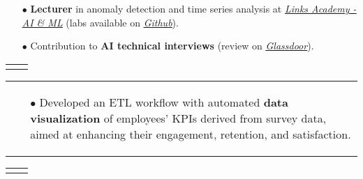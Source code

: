 \documentclass[11pt,a4paper,sans,english]{moderncv}
\makeatletter
\renewcommand*{\cventry}[6][.25em]{%
	\vspace{1.5mm}%
	\begin{tabular*}{\textwidth}{@{\extracolsep{\fill}}ll}%
		\ifthenelse{\equal{#3}{}}{}{\textbf{#3}} &
		\ifthenelse{\equal{#2}{}}{}{#4 #6 #2}\\%
	\end{tabular*}%
	\par\addvspace{#1}}
\newcommand*{\mycvitem}[2][.25em]{%
	\vspace{-.25em}
	\begin{tabular}{@{}p{\textwidth}@{}}%
		\small#2%
	\end{tabular}%
	\par\addvspace{-0.7em}  %
}
\newcommand*{\cvtag}[1]{%
	\textcolor{lightgray!50!black}{\fbox{\mathstrut\scriptsize\textsf{\textbf{#1}}}}%
}
\makeatother
\begin{document}
{\begin{itemize}
			\item[$\bullet$] \textbf{Lecturer} in anomaly detection  and time series analysis at \href{https://academy.linksmt.it/corso-di-formazione-post-laurea-artificial-intelligence-machine-learning/}{\textit{\underline{Links Academy - AI \& ML}}} (labs available on	 \href{https://github.com/francesco-s/Links-Academy---Anomaly-Detection-Time-series-analysis}{\textit{\underline{Github}}}).
			\item[$\bullet$] Contribution to \textbf{AI technical interviews} (review on \href{https://www.glassdoor.it/Colloquio/Links-Management-and-Technology-Colloquio-RVW82686296.htm}{\textit{\underline{Glassdoor}}}).
	\end{itemize}}
\vspace*{-.15cm}
\cventry{\textcolor{gray}{\scalebox{0.8}\faCalendar} 10/2022--02/2023}{Artificial Intelligence and Data - Analyst}{\textcolor{gray}{\scalebox{0.8}\faBuilding} \href{https://www2.deloitte.com}{\textit{Deloitte}} }{}{\textcolor{gray}{\scalebox{0.8}\faMapMarker} Bari }{}
\mycvitem{
\vspace*{-.6cm}
\begin{flushleft}
	\noindent
	\cvtag{Qlik Sense} \cvtag{SQL} \cvtag{MS Excel} \cvtag{Qlik NPrinting}
\end{flushleft}
\vspace*{-.2cm}
\begin{itemize}
	\item[$\bullet$] Developed an ETL workflow with automated \textbf{data visualization} of employees' KPIs derived from survey data, aimed at enhancing their engagement, retention, and satisfaction.
\end{itemize}}
\vspace*{-.15cm}
\cventry{\textcolor{gray}{\scalebox{0.8}\faCalendar} 12/2021--05/2022}{AI engineer and System Administrator - Intern}{\textcolor{gray}{\scalebox{0.8}\faBuilding} \href{https://www.intesasanpaolo.com/}{\textit{Intesa Sanpaolo}} }{}{\textcolor{gray}{\scalebox{0.8}\faMapMarker} Torino }{}
\end{document}
